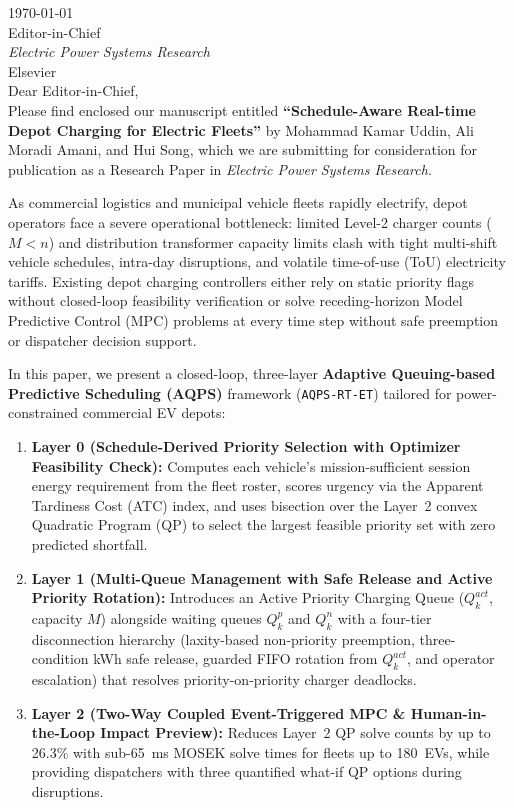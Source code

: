 \documentclass[11pt]{article}
\begin{document}
\noindent \today \\[1em]
Editor-in-Chief \\
\textit{Electric Power Systems Research} \\
Elsevier \\[1em]
Dear Editor-in-Chief, \\[1em]
Please find enclosed our manuscript entitled \textbf{``Schedule-Aware Real-time Depot Charging for Electric Fleets''} by Mohammad Kamar Uddin, Ali Moradi Amani, and Hui Song, which we are submitting for consideration for publication as a Research Paper in \textit{Electric Power Systems Research}.

As commercial logistics and municipal vehicle fleets rapidly electrify, depot operators face a severe operational bottleneck: limited Level-2 charger counts ($M < n$) and distribution transformer capacity limits clash with tight multi-shift vehicle schedules, intra-day disruptions, and volatile time-of-use (ToU) electricity tariffs. Existing depot charging controllers either rely on static priority flags without closed-loop feasibility verification or solve receding-horizon Model Predictive Control (MPC) problems at every time step without safe preemption or dispatcher decision support.

In this paper, we present a closed-loop, three-layer \textbf{Adaptive Queuing-based Predictive Scheduling (AQPS)} framework (\texttt{AQPS-RT-ET}) tailored for power-constrained commercial EV depots:
\begin{enumerate}
    \item \textbf{Layer 0 (Schedule-Derived Priority Selection with Optimizer Feasibility Check):} Computes each vehicle's mission-sufficient session energy requirement from the fleet roster, scores urgency via the Apparent Tardiness Cost (ATC) index, and uses bisection over the Layer~2 convex Quadratic Program (QP) to select the largest feasible priority set with zero predicted shortfall.
    \item \textbf{Layer 1 (Multi-Queue Management with Safe Release and Active Priority Rotation):} Introduces an Active Priority Charging Queue ($Q_k^{act}$, capacity $M$) alongside waiting queues $Q_k^p$ and $Q_k^n$ with a four-tier disconnection hierarchy (laxity-based non-priority preemption, three-condition kWh safe release, guarded FIFO rotation from $Q_k^{act}$, and operator escalation) that resolves priority-on-priority charger deadlocks.
    \item \textbf{Layer 2 (Two-Way Coupled Event-Triggered MPC \& Human-in-the-Loop Impact Preview):} Reduces Layer~2 QP solve counts by up to 26.3\% with sub-65~ms MOSEK solve times for fleets up to 180~EVs, while providing dispatchers with three quantified what-if QP options during disruptions.
\end{enumerate}
\end{document}
